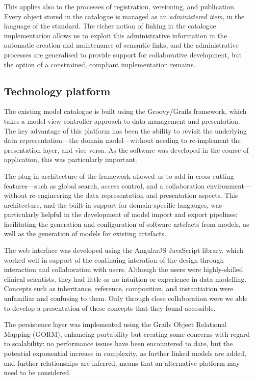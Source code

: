 This applies also to the processes of registration, versioning, and
publication.  Every object stored in the catalogue is managed as an
\emph{administered item}, in the language of the standard.  The richer
notion of linking in the catalogue implementation allows us to exploit
this administrative information in the automatic creation and
maintenance of semantic links, and the administrative processes are
generalised to provide support for collaborative development, but the
option of a constrained, compliant implementation remains. 

\subsection{Technology platform}

The existing model catalogue is built using the Groovy/Grails
framework, which takes a model-view-controller approach to data
management and presentation.  The key advantage of this platform has
been the ability to revisit the underlying data representation---the
domain model---without needing to re-implement the presentation
layer, and vice versa.  As the software was developed in the course of
application, this was particularly important. 

The plug-in architecture of the framework allowed us to add in
cross-cutting features---such as global search, access control, and a
collaboration environment---without re-engineering the data
representation and presentation aspects.  This architecture, and the
built-in support for domain-specific langauges, was particularly
helpful in the development of model import and export pipelines: 
facilitating the generation and configuration of software artefacts
from models, as well as the generation of models for existing
artefacts.

The web interface was developed using the AngularJS JavaScript
library, which worked well in support of the continuing interation of
the design through interaction and collaboration with users.  Although
the users were highly-skilled clinical scientists, they had little or
no intuition or experience in data modelling.  Concepts such as
inheritance, reference, composition, and instantiation were unfamiliar
and confusing to them.  Only through close collaboration were we able
to develop a presentation of these concepts that they found
accessible.

The persistence layer was implemented using the Grails Object
Relational Mapping (GORM), enhancing portability but creating some
concerns with regard to scalability: no performance issues have been
encountered to date, but the potential exponential increase in
complexity, as further linked models are added, and further
relationships are inferred, means that an alternative platform may
need to be considered. 

